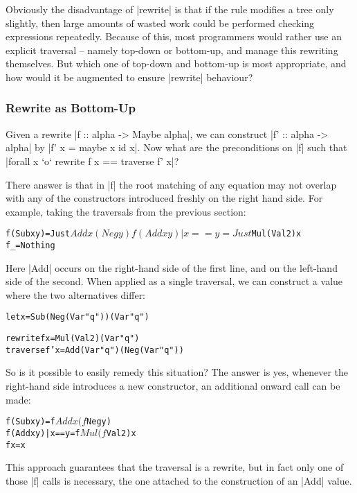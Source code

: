 \documentclass[preprint]{sigplanconf}
\newenvironment{code}{\begin{alltt}\small}{\end{alltt}}
\begin{document}
Obviously the disadvantage of |rewrite| is that if the rule modifies a tree only slightly, then large amounts of wasted work could be performed checking expressions repeatedly. Because of this, most programmers would rather use an explicit traversal -- namely top-down or bottom-up, and manage this rewriting themselves. But which one of top-down and bottom-up is most appropriate, and how would it be augmented to ensure |rewrite| behaviour?

\subsubsection{Rewrite as Bottom-Up}

Given a rewrite |f :: alpha -> Maybe alpha|, we can construct |f' :: alpha -> alpha| by |f' x = maybe x id x|. Now what are the preconditions on |f| such that |forall x `o` rewrite f x == traverse f' x|?

There answer is that in |f| the root matching of any equation may not overlap with any of the constructors introduced freshly on the right hand side. For example, taking the traversals from the previous section:

\begin{code}
f (Sub x y)           = Just $ Add x (Neg y)
f (Add x y) | x == y  = Just $ Mul (Val 2) x
f _                   = Nothing
\end{code}

Here |Add| occurs on the right-hand side of the first line, and on the left-hand side of the second. When applied as a single traversal, we can construct a value where the two alternatives differ:

\begin{code}
let x = Sub (Neg (Var "q")) (Var "q")

rewrite   f   x = Mul (Val 2) (Var "q")
traverse  f'  x = Add (Var "q") (Neg (Var "q"))
\end{code}

So is it possible to easily remedy this situation? The answer is yes, whenever the right-hand side introduces a new constructor, an additional onward call can be made:

\begin{code}
f (Sub x y)           = f $ Add x (f $ Neg y)
f (Add x y) | x == y  = f $ Mul (f $ Val 2) x
f x                   = x
\end{code}

This approach guarantees that the traversal is a rewrite, but in fact only one of those |f| calls is necessary, the one attached to the construction of an |Add| value.
\end{document}

